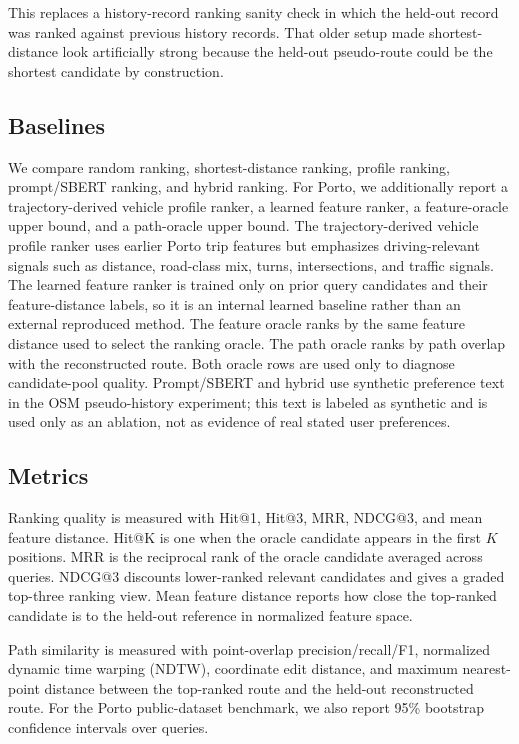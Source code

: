 This replaces a history-record ranking sanity check in which the held-out record was ranked against previous history records. That older setup made shortest-distance look artificially strong because the held-out pseudo-route could be the shortest candidate by construction.

\subsection{Baselines}
We compare random ranking, shortest-distance ranking, profile ranking, prompt/SBERT ranking, and hybrid ranking. For Porto, we additionally report a trajectory-derived vehicle profile ranker, a learned feature ranker, a feature-oracle upper bound, and a path-oracle upper bound. The trajectory-derived vehicle profile ranker uses earlier Porto trip features but emphasizes driving-relevant signals such as distance, road-class mix, turns, intersections, and traffic signals. The learned feature ranker is trained only on prior query candidates and their feature-distance labels, so it is an internal learned baseline rather than an external reproduced method. The feature oracle ranks by the same feature distance used to select the ranking oracle. The path oracle ranks by path overlap with the reconstructed route. Both oracle rows are used only to diagnose candidate-pool quality. Prompt/SBERT and hybrid use synthetic preference text in the OSM pseudo-history experiment; this text is labeled as synthetic and is used only as an ablation, not as evidence of real stated user preferences.

\subsection{Metrics}
Ranking quality is measured with Hit@1, Hit@3, MRR, NDCG@3, and mean feature distance. Hit@K is one when the oracle candidate appears in the first $K$ positions. MRR is the reciprocal rank of the oracle candidate averaged across queries. NDCG@3 discounts lower-ranked relevant candidates and gives a graded top-three ranking view. Mean feature distance reports how close the top-ranked candidate is to the held-out reference in normalized feature space.

Path similarity is measured with point-overlap precision/recall/F1, normalized dynamic time warping (NDTW), coordinate edit distance, and maximum nearest-point distance between the top-ranked route and the held-out reconstructed route. For the Porto public-dataset benchmark, we also report 95\% bootstrap confidence intervals over queries.

